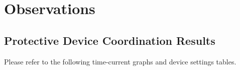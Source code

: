 \section{Observations}
\label{af:observations}

\subsection{Protective Device Coordination Results}
\label{af:observations:at}

Please refer to the following time-current graphs and device settings tables.

\pagebreak